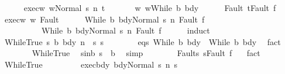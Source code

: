 \begin{isabellebody}
\ \ \ \ \isamarkupfalse%
\ exec{\isacharunderscore}w{\isacharcolon}\ {\isachardoublequoteopen}{\isasymGamma}{\isasymturnstile}{\isasymlangle}w{\isacharcomma}Normal\ s{\isasymrangle}\ {\isacharequal}n{\isasymRightarrow}\ t{\isachardoublequoteclose}\ \isanewline
\ \ \ \ \isamarkupfalse%
\ w{\isacharcolon}\ {\isachardoublequoteopen}w{\isacharequal}While\ b\ bdy{\isachardoublequoteclose}\isanewline
\ \ \ \ \isamarkupfalse%
\ Fault{\isacharcolon}\ {\isachardoublequoteopen}t{\isacharequal}Fault\ f{\isachardoublequoteclose}\isanewline
\ \ \ \ \isamarkupfalse%
\ exec{\isacharunderscore}w\ w\ Fault\isanewline
\ \ \ \ \isamarkupfalse%
\ {\isachardoublequoteopen}{\isasymGamma}{\isasymturnstile}{\isasymlangle}While\ b\ bdy{}{\isacharcomma}Normal\ s{\isasymrangle}\ {\isacharequal}n{\isasymRightarrow}\ Fault\ f{\isasymor}\ \ \isanewline
\ \ \ \ \ \ \ \ \ \ {\isasymGamma}{\isasymturnstile}{\isasymlangle}While\ b\ bdy{}{\isacharcomma}Normal\ s{\isasymrangle}\ {\isacharequal}n{\isasymRightarrow}\ Fault\ f{\isachardoublequoteclose}\isanewline
\ \ \ \ \isamarkupfalse%
\ {\isacharparenleft}induct{\isacharparenright}\isanewline
\ \ \ \ \ \ \isamarkupfalse%
\ {\isacharparenleft}WhileTrue\ s\ b{\isacharprime}\ bdy{\isacharprime}\ n\ \ s{\isacharprime}\ s{\isacharprime}{\isacharprime}{\isacharparenright}\isanewline
\ \ \ \ \ \ \isamarkupfalse%
\ eqs{\isacharcolon}\ {\isachardoublequoteopen}While\ b{\isacharprime}\ bdy{\isacharprime}\ {\isacharequal}\ While\ b\ bdy{\isachardoublequoteclose}\ \isamarkupfalse%
\ fact\isanewline
\ \ \ \ \ \ \isamarkupfalse%
\ WhileTrue\ \isamarkupfalse%
\ s{\isacharunderscore}in{\isacharunderscore}b{\isacharcolon}\ {\isachardoublequoteopen}s\ {\isasymin}\ b{\isachardoublequoteclose}\ \isamarkupfalse%
\ simp\isanewline
\ \ \ \ \ \ \isamarkupfalse%
\ Fault{\isacharunderscore}s{\isacharprime}{\isacharprime}{\isacharcolon}\ {\isachardoublequoteopen}s{\isacharprime}{\isacharprime}{\isacharequal}Fault\ f{\isachardoublequoteclose}\ \ \isamarkupfalse%
\ fact\isanewline
\ \ \ \ \ \ \isamarkupfalse%
\ WhileTrue\ \isanewline
\ \ \ \ \ \ \isamarkupfalse%
\ exec{\isacharunderscore}bdy{\isacharcolon}\ {\isachardoublequoteopen}{\isasymGamma}{\isasymturnstile}{\isasymlangle}bdy{\isacharcomma}Normal\ s{\isasymrangle}\ {\isacharequal}n{\isasymRightarrow}\ s{\isacharprime}{\isachardoublequoteclose}\ \isamarkupfalse%

\end{isabellebody}

